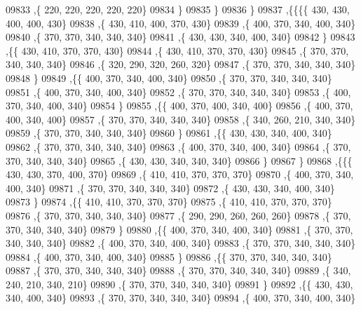 \begin{DoxyCode}
09833     ,\{   220,   220,   220,   220,   220\}
09834     \}
09835    \}
09836   \}
09837  ,\{\{\{\{   430,   430,   400,   400,   430\}
09838     ,\{   430,   410,   400,   370,   430\}
09839     ,\{   400,   370,   340,   400,   340\}
09840     ,\{   370,   370,   340,   340,   340\}
09841     ,\{   430,   430,   340,   400,   340\}
09842     \}
09843    ,\{\{   430,   410,   370,   370,   430\}
09844     ,\{   430,   410,   370,   370,   430\}
09845     ,\{   370,   370,   340,   340,   340\}
09846     ,\{   320,   290,   320,   260,   320\}
09847     ,\{   370,   370,   340,   340,   340\}
09848     \}
09849    ,\{\{   400,   370,   340,   400,   340\}
09850     ,\{   370,   370,   340,   340,   340\}
09851     ,\{   400,   370,   340,   400,   340\}
09852     ,\{   370,   370,   340,   340,   340\}
09853     ,\{   400,   370,   340,   400,   340\}
09854     \}
09855    ,\{\{   400,   370,   400,   340,   400\}
09856     ,\{   400,   370,   400,   340,   400\}
09857     ,\{   370,   370,   340,   340,   340\}
09858     ,\{   340,   260,   210,   340,   340\}
09859     ,\{   370,   370,   340,   340,   340\}
09860     \}
09861    ,\{\{   430,   430,   340,   400,   340\}
09862     ,\{   370,   370,   340,   340,   340\}
09863     ,\{   400,   370,   340,   400,   340\}
09864     ,\{   370,   370,   340,   340,   340\}
09865     ,\{   430,   430,   340,   340,   340\}
09866     \}
09867    \}
09868   ,\{\{\{   430,   430,   370,   400,   370\}
09869     ,\{   410,   410,   370,   370,   370\}
09870     ,\{   400,   370,   340,   400,   340\}
09871     ,\{   370,   370,   340,   340,   340\}
09872     ,\{   430,   430,   340,   400,   340\}
09873     \}
09874    ,\{\{   410,   410,   370,   370,   370\}
09875     ,\{   410,   410,   370,   370,   370\}
09876     ,\{   370,   370,   340,   340,   340\}
09877     ,\{   290,   290,   260,   260,   260\}
09878     ,\{   370,   370,   340,   340,   340\}
09879     \}
09880    ,\{\{   400,   370,   340,   400,   340\}
09881     ,\{   370,   370,   340,   340,   340\}
09882     ,\{   400,   370,   340,   400,   340\}
09883     ,\{   370,   370,   340,   340,   340\}
09884     ,\{   400,   370,   340,   400,   340\}
09885     \}
09886    ,\{\{   370,   370,   340,   340,   340\}
09887     ,\{   370,   370,   340,   340,   340\}
09888     ,\{   370,   370,   340,   340,   340\}
09889     ,\{   340,   240,   210,   340,   210\}
09890     ,\{   370,   370,   340,   340,   340\}
09891     \}
09892    ,\{\{   430,   430,   340,   400,   340\}
09893     ,\{   370,   370,   340,   340,   340\}
09894     ,\{   400,   370,   340,   400,   340\}

\end{DoxyCode}
